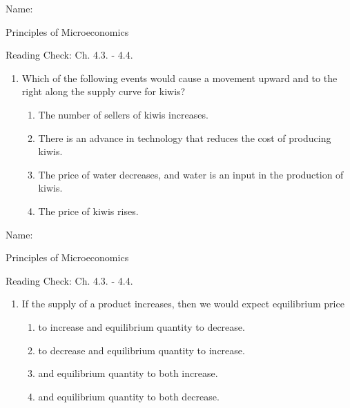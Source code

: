 \documentclass{article}
\begin{document}
\newpage

Name: \underline{\phantom{xxxxxxxxxxxxxxxxxxxxxxxxxxxxxxxxxxxxxxxx}}

Principles of Microeconomics

Reading Check: Ch. 4.3. - 4.4.

\begin{enumerate}

\item Which of the following events would cause a movement upward and to the right along the supply curve for kiwis?

	\begin{enumerate}
	
	\item The number of sellers of kiwis increases.

	\item There is an advance in technology that reduces the cost of producing kiwis.

	\item The price of water decreases, and water is an input in the production of kiwis.
	
	\item The price of kiwis rises.
	
	\end{enumerate}

\end{enumerate}

\bigskip

Name: \underline{\phantom{xxxxxxxxxxxxxxxxxxxxxxxxxxxxxxxxxxxxxxxx}}

Principles of Microeconomics

Reading Check: Ch. 4.3. - 4.4.

\begin{enumerate}

\item If the supply of a product increases, then we would expect equilibrium price

	\begin{enumerate}
	
	\item to increase and equilibrium quantity to decrease.
	
	\item to decrease and equilibrium quantity to increase.
	
	\item and equilibrium quantity to both increase.
	
	\item and equilibrium quantity to both decrease.
	
	\end{enumerate}

\end{enumerate}
\end{document}
